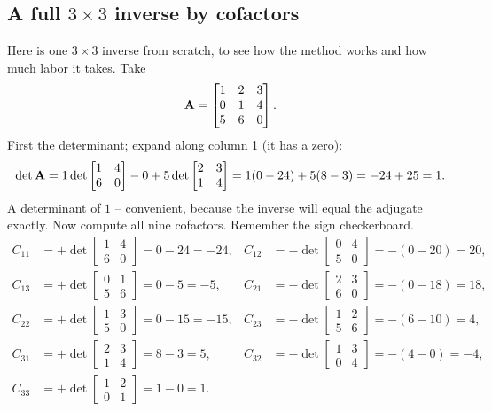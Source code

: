 \subsection{A full \texorpdfstring{$3\times3$}{3x3} inverse by cofactors}

Here is one $3\times3$ inverse from scratch, to see how the method works and how much labor it
takes. Take
\[
\mathbf{A}=\begin{bmatrix} 1 & 2 & 3 \\ 0 & 1 & 4 \\ 5 & 6 & 0 \end{bmatrix}.
\]
First the determinant; expand along column 1 (it has a zero):
\[
\det\mathbf{A}
= 1\det\begin{bmatrix}1&4\\6&0\end{bmatrix}
- 0
+ 5\det\begin{bmatrix}2&3\\1&4\end{bmatrix}
= 1(0-24) + 5(8-3) = -24 + 25 = 1.
\]
A determinant of $1$ -- convenient, because the inverse will equal the adjugate exactly. Now compute
all nine cofactors. Remember the sign checkerboard.
\[
\begin{aligned}
C_{11}&=+\det\begin{bmatrix}1&4\\6&0\end{bmatrix}=0-24=-24,
&C_{12}&=-\det\begin{bmatrix}0&4\\5&0\end{bmatrix}=-(0-20)=20,\\[2pt]
C_{13}&=+\det\begin{bmatrix}0&1\\5&6\end{bmatrix}=0-5=-5,
&C_{21}&=-\det\begin{bmatrix}2&3\\6&0\end{bmatrix}=-(0-18)=18,\\[2pt]
C_{22}&=+\det\begin{bmatrix}1&3\\5&0\end{bmatrix}=0-15=-15,
&C_{23}&=-\det\begin{bmatrix}1&2\\5&6\end{bmatrix}=-(6-10)=4,\\[2pt]
C_{31}&=+\det\begin{bmatrix}2&3\\1&4\end{bmatrix}=8-3=5,
&C_{32}&=-\det\begin{bmatrix}1&3\\0&4\end{bmatrix}=-(4-0)=-4,\\[2pt]
C_{33}&=+\det\begin{bmatrix}1&2\\0&1\end{bmatrix}=1-0=1.
\end{aligned}
\]
